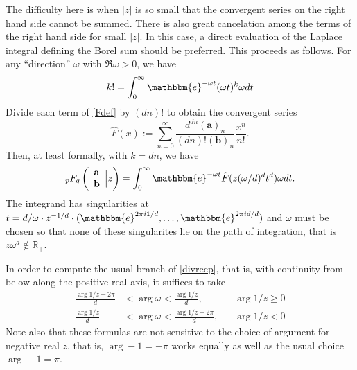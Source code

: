 \documentclass[12pt]{article}
\newcommand{\ee}[0] {\mathbbm{e}}
\numberwithin{equation}{section}
\newcommand{\FF}[6] {{}_{#1}{#2}_{#3} \left( \begin{array}{c} #4 \\ #5 \end{array} \Big| {#6}  \right)}
\begin{document}
The difficulty here is when $|z|$ is so small that the convergent series on the right hand side cannot be summed. There is also great cancelation among the terms of the right hand side for small $|z|$. In this case, a direct evaluation of the Laplace integral defining the Borel sum should be preferred. This proceeds
as follows. For any ``direction'' $\omega$ with $\Re \omega > 0$, we have
\begin{equation*}
k! = \int_0^{\infty} \ee^{-\omega t} (\omega t)^k \omega dt
\end{equation*}
Divide each term of \eqref{Fdef} by $(dn)!$ to obtain the convergent series
\begin{equation*}
\hat{F}(x) := \sum_{n=0}^{\infty} \frac{d^{d n}(\mathbf{a})_n}{(dn)!(\mathbf{b})_n} \frac{x^n}{n!}\text{.}
\end{equation*}
Then, at least formally, with $k = dn$, we have
\begin{equation*}
\FF{p}{F}{q}{\mathbf{a}}{\mathbf{b}}{z} = \int_{0}^{\infty} \ee^{-\omega t} \hat{F}(z(\omega/d)^d t^d) \omega dt \text{.}
\end{equation*}
The integrand has singularities at $t = d/\omega \cdot z^{-1/d} \cdot (\ee^{2\pi i 1/ d}, \dots, \ee^{2\pi i  d / d})$
and $\omega$ must be chosen so that none of these singularites lie on the path of integration, that is $z \omega^d \not \in \mathbb{R}_{+}$.

In order to compute the usual branch of \eqref{divrecp}, that is, with continuity from below along the positive real axis, it suffices to take
\begin{equation*}
\begin{alignedat}{3}
\frac{\arg 1/z - 2\pi}{d} &< \arg \omega < \frac{\arg 1/z}{d} \text{,} \quad & \arg 1/z \ge 0\\
\frac{\arg 1/z}{d} &< \arg \omega < \frac{\arg 1/z + 2\pi}{d} \text{,} \quad & \arg 1/z < 0
\end{alignedat}
\end{equation*}
Note also that these formulas are not sensitive to the choice of argument for negative real $z$, that is, $\arg -1 = -\pi$ works equally as well as the usual choice $\arg -1 = \pi$.
\end{document}
